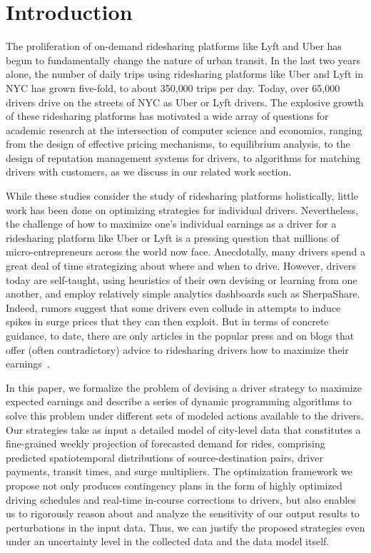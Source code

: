 
\section{Introduction}
\label{sec:introduction}

The proliferation of on-demand ridesharing platforms like Lyft and Uber
  has begun to fundamentally change the nature of urban transit. 
In the last two years alone, the number of daily trips using ridesharing 
  platforms like Uber and Lyft in NYC has grown five-fold, 
  to about 350,000 trips per day. 
Today, over 65,000 drivers drive on the streets of NYC as Uber or Lyft drivers.
The explosive growth of these ridesharing platforms has motivated a wide
  array of questions for academic research at the intersection of computer
  science and economics, ranging from the design of effective pricing mechanisms, 
  to equilibrium analysis, to the design of reputation management systems for 
  drivers, to algorithms for matching drivers with 
  customers, as we discuss in our related work section.

While these studies consider the study of ridesharing platforms holistically, 
   little work has been done on optimizing strategies for individual drivers. 
Nevertheless, the challenge of how to maximize one's individual earnings as a driver for a 
ridesharing platform like Uber or Lyft is a pressing question that millions of micro-entrepreneurs 
across the world now face.  Anecdotally, many drivers spend a great deal of time 
strategizing about where and when to drive.  However, drivers today are 
self-taught, using heuristics of their own devising or learning from one another, 
and employ relatively simple analytics dashboards such as SherpaShare.
Indeed, rumors suggest that some drivers even collude in attempts to induce spikes in surge prices that they can then exploit.
But in terms of concrete guidance, to date, there are only articles in the
  popular press and on blogs that offer (often contradictory) advice to ridesharing drivers 
  how to maximize their earnings~\cite{dont,tips,sherpashareNYT}.

In this paper, we formalize the problem of devising a driver strategy to maximize expected 
 earnings and describe a series of dynamic programming algorithms to solve this problem
 under different sets of modeled actions available to the drivers. 
Our strategies take as input a detailed model of city-level data that constitutes a 
  fine-grained weekly projection of forecasted demand for rides, comprising 
  predicted spatiotemporal distributions of source-destination pairs, driver payments,
  transit times, and surge multipliers. 
The optimization framework we propose not only produces contingency plans in the form of
  highly optimized driving schedules and real-time in-course corrections to drivers, but 
  also enables us to rigorously reason about and analyze the sensitivity of our output 
  results to perturbations in the input data.  
Thus, we can justify the proposed strategies even under an uncertainty level in the
  collected data and the data model itself.
  
